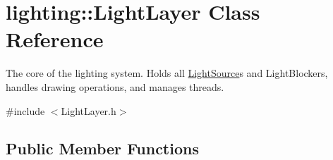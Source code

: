 \hypertarget{classlighting_1_1LightLayer}{}\section{lighting\+:\+:Light\+Layer Class Reference}
\label{classlighting_1_1LightLayer}


The core of the lighting system. Holds all \hyperlink{classlighting_1_1LightSource}{Light\+Source}s and Light\+Blockers, handles drawing operations, and manages threads.  




{\ttfamily \#include $<$Light\+Layer.\+h$>$}

\subsection*{Public Member Functions}
